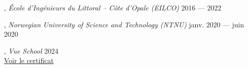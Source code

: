 , \textit{École d'Ingénieurs du Littoral – Côte d'Opale (EILCO)} \hfill 2016 --- 2022

, \textit{Norwegian University of Science and Technology (NTNU)} \hfill janv. 2020 --- juin 2020

, \textit{Vue School} \hfill 2024 \\
\hspace*{1.5em}\small{\href{https://api.certificates.dev/certificates/9cfd1f5a-286f-4565-bc7c-8331c2c55d82/download?signature=4e37fd60f1cfe47ed69a05684eb956809c4ba754e2ea1205cef27db20957e2f8}{Voir le certificat}}

